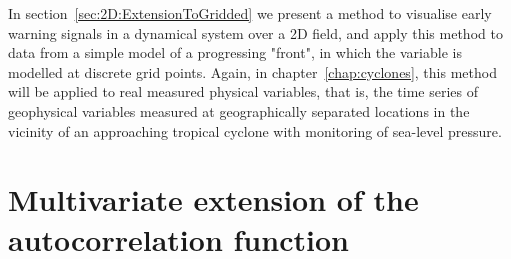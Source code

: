     	In section~\ref{sec:2D:ExtensionToGridded} we present a method to visualise early warning signals in a dynamical system over a 2D field, and apply this method to data from a simple model of a progressing "front", in which the variable is modelled at discrete grid points. Again, in chapter~\ref{chap:cyclones}, this method will be applied to real measured physical variables, that is, the  time series of geophysical variables measured at geographically separated locations in the vicinity of an approaching tropical cyclone with monitoring of sea-level pressure.
    	
    	

\section{Multivariate extension of the autocorrelation function}
\label{sec:2D:Williamson}

